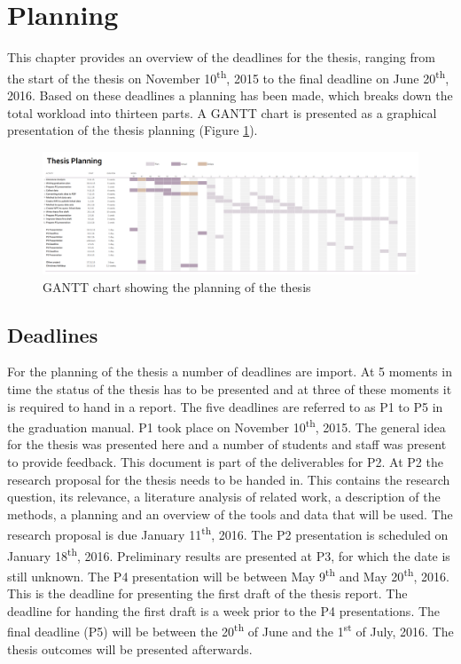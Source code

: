 

\section{Planning}
\label{chap:planning}

This chapter provides an overview of the deadlines for the thesis, ranging from the start of the thesis on November 10\textsuperscript{th}, 2015 to the final deadline on June 20\textsuperscript{th}, 2016. Based on these deadlines a planning has been made, which breaks down the total workload into thirteen parts. A GANTT chart is presented as a graphical presentation of the thesis planning (Figure \ref{fig:GANTT}).

\begin{figure}
	\centering
	\includegraphics[width=1.5\linewidth, angle=90]{figs/GANTT-chart.png}
	\caption{GANTT chart showing the planning of the thesis}
	\label{fig:GANTT}
\end{figure}

\subsection{Deadlines}
For the planning of the thesis a number of deadlines are import. At 5 moments in time the status of the thesis has to be presented and at three of these moments it is required to hand in a report. The five deadlines are referred to as P1 to P5 in the graduation manual. P1 took place on November 10\textsuperscript{th}, 2015. The general idea for the thesis was presented here and a number of students and staff was present to provide feedback. This document is part of the deliverables for P2. At P2 the research proposal for the thesis needs to be handed in. This contains the research question, its relevance, a literature analysis of related work, a description of the methods, a planning and an overview of the tools and data that will be used. The research proposal is due January 11\textsuperscript{th}, 2016. The P2 presentation is scheduled on January 18\textsuperscript{th}, 2016. Preliminary results are presented at P3, for which the date is still unknown. The P4 presentation will be between May 9\textsuperscript{th} and May 20\textsuperscript{th}, 2016. This is the deadline for presenting the first draft of the thesis report. The deadline for handing the first draft is a week prior to the P4 presentations. The final deadline (P5) will be between the 20\textsuperscript{th} of June and the 1\textsuperscript{st} of July, 2016. The thesis outcomes will be presented afterwards.

